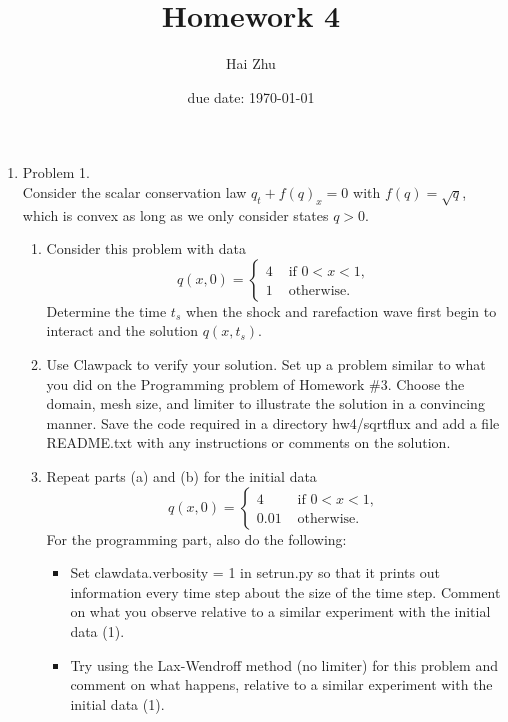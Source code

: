 \documentclass[11pt]{article}
\begin{document}
\title{\Large\bf Homework 4}
\author{Hai Zhu}
\date{due date: \today}
\maketitle
\thispagestyle{fancy}
\renewcommand{\qed}{\hfill \mbox{\raggedright \rule{0.07in}{0.1in}}} %

\begin{enumerate}
    \item Problem 1.\\
    
            Consider the scalar conservation law $q_t+f(q)_x=0$ with $f(q)=\sqrt{q}$, which is convex as long as we only consider states $q>0$.
            \begin{enumerate}
            
				\item
					Consider this problem with data   
					\begin{equation}
					q(x,0)=\begin{cases}4  &\text{  if } 0<x<1,\\
					1 &\text{  otherwise}.\end{cases}
					\end{equation} 
					Determine the time $t_s$ when the shock and rarefaction wave first begin to interact and the solution $q(x,t_s)$.
				\item
					Use Clawpack to verify your solution. Set up a problem similar to what you did on the Programming problem of Homework $\#3$. Choose the domain, mesh size, and limiter to illustrate the solution in a convincing manner. Save the code required in a directory \textsf{hw4/sqrtflux} and add a file \textsf{README.txt} with any instructions or comments on the solution.
				\item
					Repeat parts (a) and (b) for the initial data
					\begin{equation}
					q(x,0)=\begin{cases}4  &\text{  if } 0<x<1,\\
					0.01 &\text{  otherwise}.\end{cases}
					\end{equation} 
				For the programming part, also do the following:
				\begin{itemize}
					\item
						Set \textsf{clawdata.verbosity = 1} in \textsf{setrun.py} so that it prints out information every time step about the size of the time step. Comment on what you observe relative to a similar experiment with the initial data (1).
					\item
						Try using the Lax-Wendroff method (no limiter) for this problem and comment on what happens, relative to a similar experiment with the initial data (1).
				\end{itemize}     
            

\end{enumerate}
\end{enumerate}
\end{document}
